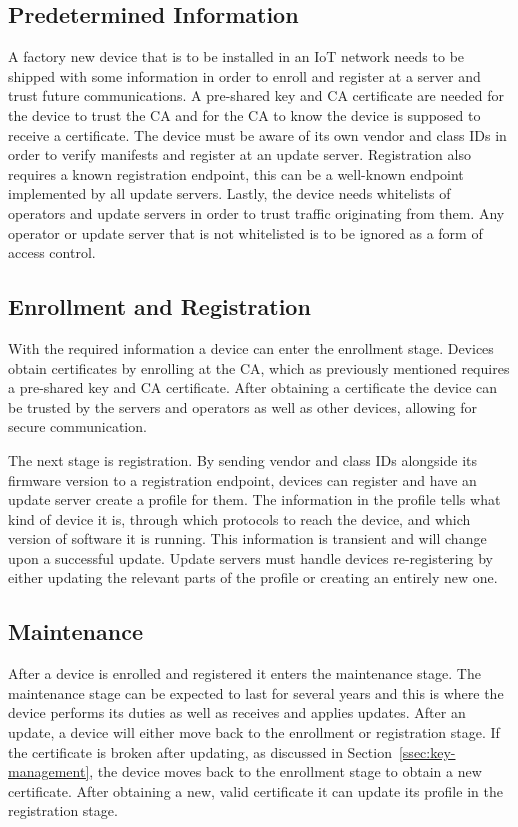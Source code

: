 \documentclass[0-thesis.tex]{subfiles}
\begin{document}
\subsection{Predetermined Information}
\label{ssec:predetermined-information}
A factory new device that is to be installed in an IoT network needs to be shipped with
some information in order to enroll and register at a server and trust future
communications. A pre-shared key and CA certificate are needed for the device to trust the
CA and for the CA to know the device is supposed to receive a certificate. The device must
be aware of its own vendor and class IDs in order to verify manifests and register at an
update server. Registration also requires a known registration endpoint, this can be a
well-known endpoint implemented by all update servers. Lastly, the device needs whitelists
of operators and update servers in order to trust traffic originating from them. Any
operator or update server that is not whitelisted is to be ignored as a form of access
control.

\subsection{Enrollment and Registration}
\label{ssec:enrollment-registration}
With the required information a device can enter the enrollment stage. Devices obtain
certificates by enrolling at the CA, which as previously mentioned requires a pre-shared
key and CA certificate. After obtaining a certificate the device can be trusted by the
servers and operators as well as other devices, allowing for secure communication.

The next stage is registration. By sending vendor and class IDs alongside its firmware
version to a registration endpoint, devices can register and have an update server create
a profile for them. The information in the profile tells what kind of device it is,
through which protocols to reach the device, and which version of software it is running.
This information is transient and will change upon a successful update. Update servers
must handle devices re-registering by either updating the relevant parts of the profile or
creating an entirely new one.

\subsection{Maintenance}
\label{ssec:maintenance}
After a device is enrolled and registered it enters the maintenance stage. The maintenance
stage can be expected to last for several years and this is where the device performs its
duties as well as receives and applies updates. After an update, a device will either move
back to the enrollment or registration stage. If the certificate is broken after updating,
as discussed in Section~\ref{ssec:key-management}, the device moves back to the enrollment
stage to obtain a new certificate. After obtaining a new, valid certificate it can update
its profile in the registration stage. 
\end{document}
